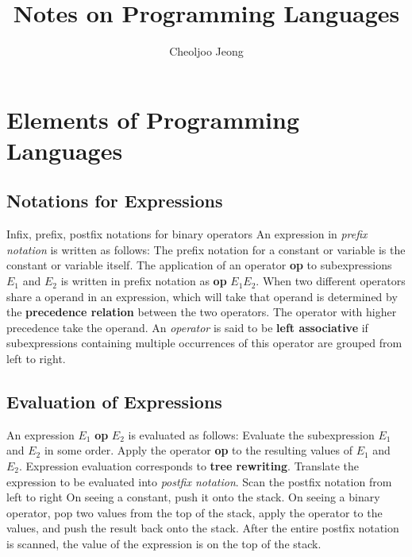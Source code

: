 \documentclass{article}
\begin{document}
\title{\large\bf{}Notes on Programming Languages}
\author{\normalsize{}Cheoljoo Jeong}
\date{}
\maketitle
\small

\section{Elements of Programming Languages}
\subsection{Notations for Expressions}
\bit
\w Infix, prefix, postfix notations for binary operators
\w An expression in {\em{}prefix notation\/} is written as follows:
	\ben
	\w [(a)] The prefix notation for a constant or variable is
		the constant or variable itself.
	\w [(b)] The application of an operator {\bf{}op} to 
		subexpressions $E_1$ and $E_2$ is written in
		prefix notation as {\bf{}op} $E_1 E_2$.
	\een
\w When two different operators share a operand in an expression,
	which will take that operand is determined by the 
	{\bf{}precedence relation\/} between the two operators.
	\bit
	\w The operator with higher precedence take the operand.
	\eit
\w An {\em{}operator\/}
	is said to be {\bf{}left associative} if subexpressions
	containing multiple occurrences of this 
	operator are grouped from left to right.
\eit

\subsection{Evaluation of Expressions}
\bit
\w An expression $E_1$ {\bf{}op} $E_2$ is evaluated as follows:
	\ben	
	\w [(a)] Evaluate the subexpression $E_1$ and $E_2$ in some order.
	\w [(b)] Apply the operator {\bf{}op} to the resulting values of
		$E_1$ and $E_2$.
	\een
\w Expression evaluation corresponds to {\bf{}tree rewriting}.
	\ben
	\w [(a)] Translate the expression to be evaluated into 
		{\em{}postfix notation\/}.
	\w [(b)] Scan the postfix notation from left to right
		\ben
		\w [(b.1)] On seeing a constant, push it onto the stack.
		\w [(b.2)] On seeing a binary operator, pop two values from
			the top of the stack, apply the operator to the values,
			and push the result back onto the stack.
		\een
	\w [(c)] After the entire postfix notation is scanned, the value 
		of the expression is on the top of the stack.
	\een
\eit
\end{document}
